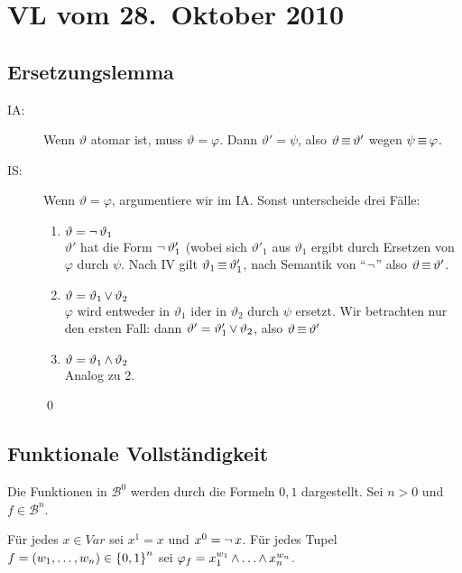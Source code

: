 \section{VL vom 28.~Oktober 2010}

\subsection{Ersetzungslemma}

\begin{description}
  \item[IA:]
  Wenn $\vartheta$ atomar ist, muss $\vartheta = \varphi$. Dann $\vartheta'=\psi$,
  also $\vartheta\operatorname{\equiv}\vartheta'$ wegen $\psi\operatorname{\equiv}\varphi$.

  \item[IS:]
  Wenn $\vartheta=\varphi$, argumentiere wir im IA. Sonst unterscheide drei Fälle:

  \begin{enumerate}
    \item $\vartheta = \operatorname{\neg} \vartheta_1$\\
    $\vartheta'$ hat die Form $\operatorname{\neg}\vartheta'_1$ (wobei sich $\vartheta'_1$ aus
    $\vartheta_1$ ergibt durch Ersetzen von $\varphi$ durch $\psi$. Nach IV gilt
    $\vartheta_1\operatorname{\equiv}\vartheta'_1$, nach Semantik von \enquote{$\operatorname{\neg}$} also
    $\vartheta\operatorname{\equiv}\vartheta'$.
    
    \item $\vartheta = \vartheta_1\operatorname{\vee}\vartheta_2$\\
    $\varphi$ wird entweder in $\vartheta_1$ ider in $\vartheta_2$ durch $\psi$
    ersetzt. Wir betrachten nur den ersten Fall: dann
    $\vartheta'=\vartheta'_1\operatorname{\vee}\vartheta_2$, also $\vartheta\operatorname{\equiv}\vartheta'$
    
    \item $\vartheta = \vartheta_1\operatorname{\wedge}\vartheta_2$\\
    Analog zu 2.
  \end{enumerate}
  \qed
\end{description}


\subsection{Funktionale Vollständigkeit}

Die Funktionen in $\mathcal{B}^0$ werden durch die Formeln $0,1$ dargestellt.
Sei $n>0$ und $f\in\mathcal{B}^n$.

Für jedes $x\in Var$ sei $x^1=x$ und $x^0=\operatorname{\neg} x$. Für jedes Tupel
$f=(w_1,\dots,w_n)\in\left\{0,1\right\}^n$ sei $\varphi_f=x_1^{w_1}\operatorname{\wedge}\dots\operatorname{\wedge} x_n^{w_n}$.

